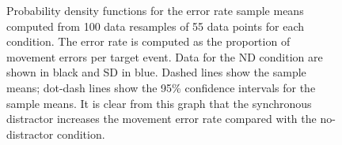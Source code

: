 \documentclass[10pt,letterpaper]{article}
\providecommand{\DIFdelbegin}{} %
\begin{document}
\begin{figure}[htb!]
\centering
\caption[Bootstrapped error PDFS] {Probability density functions for
  the error rate sample means computed from 100 data resamples of 55
  data points for each condition. The error rate is computed as the
  proportion of movement errors per target event. Data for the ND
  condition are shown in black and SD in blue. Dashed lines show the
  sample means; dot-dash lines show the 95\% confidence intervals for
  the sample means. It is clear from this graph that
  the synchronous distractor increases the movement error rate
  compared with the no-distractor condition.}
\label{bootstrap_errors}
\end{figure}

\DIFdelbegin %

\end{document}
